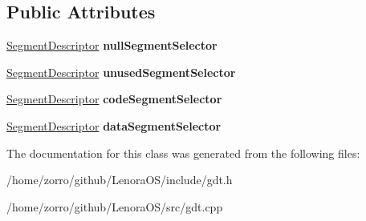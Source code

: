 \subsection*{Public Attributes}
\begin{DoxyCompactItemize}
\item 
\mbox{\label{classlenora_1_1GlobalDescriptorTable_a5c2929e7d8411e0701eef53d3d78d2ad}} 
\hyperlink{classlenora_1_1GlobalDescriptorTable_1_1SegmentDescriptor}{Segment\+Descriptor} {\bfseries null\+Segment\+Selector}
\item 
\mbox{\label{classlenora_1_1GlobalDescriptorTable_a81d7f4a8c5493e8138d4d2311ebb5513}} 
\hyperlink{classlenora_1_1GlobalDescriptorTable_1_1SegmentDescriptor}{Segment\+Descriptor} {\bfseries unused\+Segment\+Selector}
\item 
\mbox{\label{classlenora_1_1GlobalDescriptorTable_aa236fad95318a712db0fb8dbf0e2e47b}} 
\hyperlink{classlenora_1_1GlobalDescriptorTable_1_1SegmentDescriptor}{Segment\+Descriptor} {\bfseries code\+Segment\+Selector}
\item 
\mbox{\label{classlenora_1_1GlobalDescriptorTable_a146dd72b7f1730d1b3e93da63be976ac}} 
\hyperlink{classlenora_1_1GlobalDescriptorTable_1_1SegmentDescriptor}{Segment\+Descriptor} {\bfseries data\+Segment\+Selector}
\end{DoxyCompactItemize}


The documentation for this class was generated from the following files\+:\begin{DoxyCompactItemize}
\item 
/home/zorro/github/\+Lenora\+O\+S/include/gdt.\+h\item 
/home/zorro/github/\+Lenora\+O\+S/src/gdt.\+cpp\end{DoxyCompactItemize}

